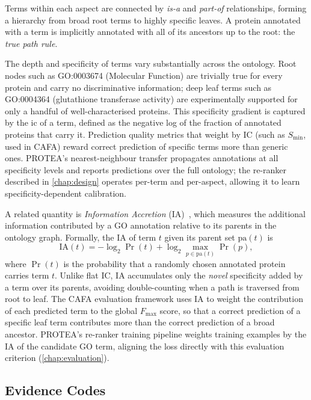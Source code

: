 Terms within each aspect are connected by \textit{is-a} and \textit{part-of}
relationships, forming a hierarchy from broad root terms to highly specific
leaves. A protein annotated with a term is implicitly annotated with all of its
ancestors up to the root: the \textit{true path rule}.

The depth and specificity of terms vary substantially across the ontology. Root
nodes such as GO:0003674 (Molecular Function) are trivially true for every protein
and carry no discriminative information; deep leaf terms such as
GO:0004364 (glutathione transferase activity) are experimentally supported for
only a handful of well-characterised proteins. This specificity gradient is
captured by the \gls{ic} of a term, defined as the
negative log of the fraction of annotated proteins that carry it. Prediction
quality metrics that weight by IC (such as $S_{\min}$, used in CAFA) reward
correct prediction of specific terms more than generic ones. PROTEA's nearest-neighbour
transfer propagates annotations at all specificity levels and reports predictions
over the full ontology; the re-ranker described in \cref{chap:design} operates
per-term and per-aspect, allowing it to learn specificity-dependent calibration.

A related quantity is \textit{Information Accretion}
(IA)~\cite{clark2013information}, which measures the additional information
contributed by a GO annotation relative to its parents in the ontology graph.
Formally, the IA of term $t$ given its parent set $\text{pa}(t)$ is
\[
  \mathrm{IA}(t) = -\log_2 \Pr(t) + \log_2 \max_{p \in \text{pa}(t)} \Pr(p),
\]
where $\Pr(t)$ is the probability that a randomly chosen annotated protein carries
term $t$. Unlike flat IC, IA accumulates only the \textit{novel} specificity added
by a term over its parents, avoiding double-counting when a path is traversed from
root to leaf. The CAFA evaluation framework uses IA to weight the contribution of
each predicted term to the global $F_{\max}$ score, so that a correct prediction of
a specific leaf term contributes more than the correct prediction of a broad
ancestor. PROTEA's re-ranker training pipeline weights training examples by the IA
of the candidate GO term, aligning the loss directly with this evaluation criterion
(\cref{chap:evaluation}).

\subsection{Evidence Codes}
\label{subsec:evidence-codes}

